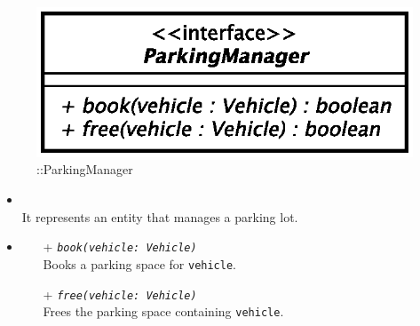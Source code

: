 \begin{figure}[h]
\centering
\includegraphics[scale=0.6,keepaspectratio]{images/solution/app/backend/parking_manager.eps}
\caption{\pReactiveComponentStretchDecoration::ParkingManager}
\label{fig:sd-app-parking-manager}
\end{figure}
\FloatBarrier
\begin{itemize}
  \item \textbf{\descr} \\
    It represents an entity that manages a parking lot.
  \item \textbf{\ops}
  \begin{itemize}
   \item[+] \texttt{\textit{book(vehicle: Vehicle)}} \\
   Books a parking space for \texttt{vehicle}.
   \item[+] \texttt{\textit{free(vehicle: Vehicle)}} \\
   Frees the parking space containing \texttt{vehicle}.
  \end{itemize}
\end{itemize}
